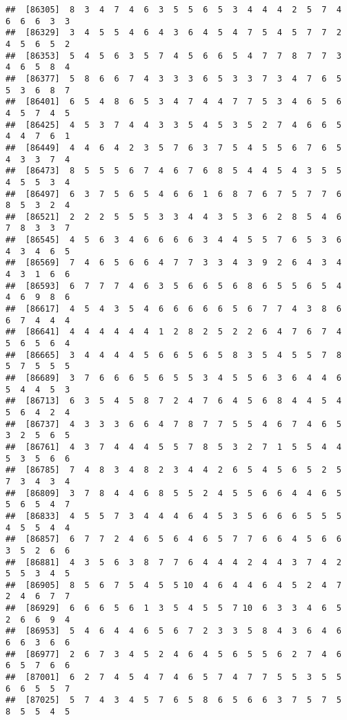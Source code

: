 \documentclass[
]{book}
\begin{document}
\begin{verbatim}
##  [86305]  8  3  4  7  4  6  3  5  5  6  5  3  4  4  4  2  5  7  4  6  6  6  3  3
##  [86329]  3  4  5  5  4  6  4  3  6  4  5  4  7  5  4  5  7  7  2  4  5  6  5  2
##  [86353]  5  4  5  6  3  5  7  4  5  6  6  5  4  7  7  8  7  7  3  4  6  5  8  4
##  [86377]  5  8  6  6  7  4  3  3  3  6  5  3  3  7  3  4  7  6  5  5  3  6  8  7
##  [86401]  6  5  4  8  6  5  3  4  7  4  4  7  7  5  3  4  6  5  6  4  5  7  4  5
##  [86425]  4  5  3  7  4  4  3  3  5  4  5  3  5  2  7  4  6  6  5  4  4  7  6  1
##  [86449]  4  4  6  4  2  3  5  7  6  3  7  5  4  5  5  6  7  6  5  4  3  3  7  4
##  [86473]  8  5  5  5  6  7  4  6  7  6  8  5  4  4  5  4  3  5  5  4  5  5  3  4
##  [86497]  6  3  7  5  6  5  4  6  6  1  6  8  7  6  7  5  7  7  6  8  5  3  2  4
##  [86521]  2  2  2  5  5  5  3  3  4  4  3  5  3  6  2  8  5  4  6  7  8  3  3  7
##  [86545]  4  5  6  3  4  6  6  6  6  3  4  4  5  5  7  6  5  3  6  4  3  4  6  5
##  [86569]  7  4  6  5  6  6  4  7  7  3  3  4  3  9  2  6  4  3  4  4  3  1  6  6
##  [86593]  6  7  7  7  4  6  3  5  6  6  5  6  8  6  5  5  6  5  4  4  6  9  8  6
##  [86617]  4  5  4  3  5  4  6  6  6  6  6  5  6  7  7  4  3  8  6  6  7  4  4  4
##  [86641]  4  4  4  4  4  4  1  2  8  2  5  2  2  6  4  7  6  7  4  5  6  5  6  4
##  [86665]  3  4  4  4  4  5  6  6  5  6  5  8  3  5  4  5  5  7  8  5  7  5  5  5
##  [86689]  3  7  6  6  6  5  6  5  5  3  4  5  5  6  3  6  4  4  6  5  4  4  5  3
##  [86713]  6  3  5  4  5  8  7  2  4  7  6  4  5  6  8  4  4  5  4  5  6  4  2  4
##  [86737]  4  3  3  3  6  6  4  7  8  7  7  5  5  4  6  7  4  6  5  3  2  5  6  5
##  [86761]  4  3  7  4  4  4  5  5  7  8  5  3  2  7  1  5  5  4  4  5  3  5  6  6
##  [86785]  7  4  8  3  4  8  2  3  4  4  2  6  5  4  5  6  5  2  5  7  3  4  3  4
##  [86809]  3  7  8  4  4  6  8  5  5  2  4  5  5  6  6  4  4  6  5  5  6  5  4  7
##  [86833]  4  5  5  7  3  4  4  4  6  4  5  3  5  6  6  6  5  5  5  4  5  5  4  4
##  [86857]  6  7  7  2  4  6  5  6  4  6  5  7  7  6  6  4  5  6  6  3  5  2  6  6
##  [86881]  4  3  5  6  3  8  7  7  6  4  4  4  2  4  4  3  7  4  2  5  5  3  4  5
##  [86905]  8  5  6  7  5  4  5  5 10  4  6  4  4  6  4  5  2  4  7  2  4  6  7  7
##  [86929]  6  6  6  5  6  1  3  5  4  5  5  7 10  6  3  3  4  6  5  2  6  6  9  4
##  [86953]  5  4  6  4  4  6  5  6  7  2  3  3  5  8  4  3  6  4  6  6  6  3  6  6
##  [86977]  2  6  7  3  4  5  2  4  6  4  5  6  5  5  6  2  7  4  6  6  5  7  6  6
##  [87001]  6  2  7  4  5  4  7  4  6  5  7  4  7  7  5  5  3  5  5  6  6  5  5  7
##  [87025]  5  7  4  3  4  5  7  6  5  8  6  5  6  6  3  7  5  7  5  8  5  5  4  5

\end{verbatim}
\end{document}
